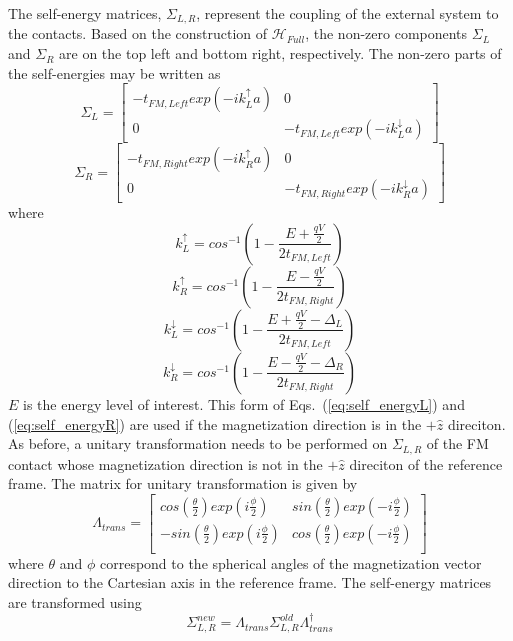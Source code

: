 The self-energy matrices, $\Sigma_{L,R}$, represent the coupling of the external system to the contacts. Based on the construction of $\mathcal{H}_{Full}$,  the non-zero components $\Sigma_{L}$ and $\Sigma_{R}$ are on the top left and bottom right, respectively. The non-zero parts of the self-energies may be written as \begin{equation}\label{eq:self_energyL}
\Sigma_{L}=
\begin{bmatrix}
-t_{FM,Left}exp\left(-ik_{L}^{\uparrow}a\right) & 0 \\
0 & -t_{FM,Left}exp\left(-ik_{L}^{\downarrow}a\right)
\end{bmatrix}
\end{equation}\begin{equation}\label{eq:self_energyR}
\Sigma_{R}=
\begin{bmatrix}
-t_{FM,Right}exp\left(-ik_{R}^{\uparrow}a\right) & 0 \\
0 & -t_{FM,Right}exp\left(-ik_{R}^{\downarrow}a\right)
\end{bmatrix}
\end{equation} where \begin{equation}
k_{L}^{\uparrow}=cos^{-1}\left(1-\frac{E+\frac{qV}{2}}{2t_{FM,Left}} \right)
\end{equation}\begin{equation}
k_{R}^{\uparrow}=cos^{-1}\left(1-\frac{E-\frac{qV}{2}}{2t_{FM,Right}} \right)
\end{equation}\begin{equation}
k_{L}^{\downarrow}=cos^{-1}\left(1-\frac{E+\frac{qV}{2}-\Delta_{L}}{2t_{FM,Left}} \right)
\end{equation}\begin{equation}
k_{R}^{\downarrow}=cos^{-1}\left(1-\frac{E-\frac{qV}{2}-\Delta_{R}}{2t_{FM,Right}} \right)
\end{equation}$E$ is the energy level of interest. This form of Eqs.~(\ref{eq:self_energyL}) and (\ref{eq:self_energyR}) are used if the magnetization direction is in the $+\widehat{z}$ direciton. As before, a unitary transformation needs to be performed on $\Sigma_{L,R}$ of the FM contact whose magnetization direction is not in the $+\widehat{z}$ direciton of the reference frame. The matrix for unitary transformation is given by \begin{equation}
\Lambda_{trans} =
\begin{bmatrix}
cos\left(\frac{\theta}{2}\right)exp\left(i\frac{\phi}{2}\right) & sin\left(\frac{\theta}{2}\right)exp\left(-i\frac{\phi}{2}\right) \\
-sin\left(\frac{\theta}{2}\right)exp\left(i\frac{\phi}{2}\right) & cos\left(\frac{\theta}{2}\right)exp\left(-i\frac{\phi}{2}\right) \\
\end{bmatrix}
\end{equation} where $\theta$ and $\phi$ correspond to the spherical angles of the magnetization vector direction to the Cartesian axis in the reference frame. The self-energy matrices are transformed using \begin{equation}
\Sigma_{L,R}^{new}=\Lambda_{trans}\Sigma_{L,R}^{old}\Lambda_{trans}^{\dagger}
\end{equation}

